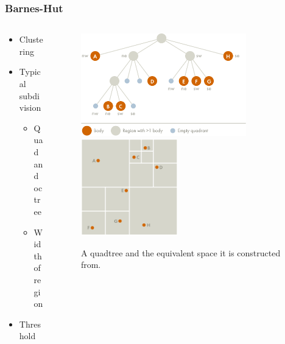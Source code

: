 \begin{frame}
  \frametitle{Barnes-Hut}
 \begin{columns}[T] %
 \begin{column}{.48\textwidth}
  \begin{itemize}
      \item Clustering
      \item Typical subdivision
      \begin{itemize}
          \item Quad and octree
          \item Width of region
      \end{itemize}
      \item Threshold
  \end{itemize}
\end{column}
 \begin{column}{.48\textwidth}
  \begin{figure}
      \centering
      \includegraphics[width=0.8\textwidth]{../report/assests/example-tree.png}
      \includegraphics[width=0.47\textwidth]{../report/assests/example-space.png}
      \caption{A quadtree and the equivalent space it is constructed from.}
      \label{fig:subdivision}
  \end{figure}
  \end{column}
  \end{columns}
\end{frame}

